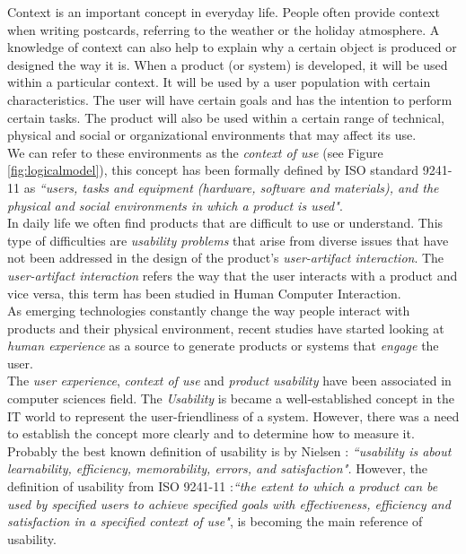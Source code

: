 Context is an important concept in everyday life. People often provide
context when writing postcards, referring to the weather or the holiday
atmosphere. A knowledge of context can also help to explain why a certain
object is produced or designed the way it is. When a product 
(or system) is developed, it
will be used within a particular context. It will be used by a user
population with certain characteristics. The user will have certain
goals and has the intention to perform certain tasks. The product 
will also be used
within a certain range of technical, physical and social or
organizational environments \cite{maguire2001context} that may affect
its use.\\   
We can refer to these environments as the \textit{context of use} (see
Figure \ref{fig:logicalmodel}), this concept has been formally defined
by ISO standard 9241-11 \cite{international1998iso} as \textit{``users,
tasks and equipment (hardware, software and materials), and the
physical and social environments in which a product is used"}. \\ 
In daily life we often find products that are difficult to use or
understand. This type of difficulties are \textit{usability problems}
that arise from  diverse issues that have not been addressed in the
design of the product's \textit{user-artifact interaction}. The
\textit{user-artifact interaction} refers the way that the user
interacts with a product and vice versa, this term has been studied
in Human Computer Interaction. \\As emerging technologies constantly
change the way people interact with products and their physical
environment, recent studies have started looking at \textit{human
experience} as a source to generate products or systems that
\textit{engage} the user.\\
The \textit{user experience}, \textit{context of use} and
\textit{product usability} have been associated in computer sciences
field. The \textit{Usability} is became a well-established concept in
the IT world to represent the user-friendliness of a system. However,
there was a need to establish the concept more clearly and to
determine how to measure it. Probably the best known definition of
usability is by Nielsen \cite{nielsen1994usability}: 
\textit{``usability is about learnability, efficiency, 
memorability, errors, and satisfaction".}
However, the definition of usability from ISO
9241-11 \cite{international1998iso}:\textit{``the extent to which a
product can be used by specified users to achieve specified  goals
with effectiveness, efficiency and satisfaction in a  specified
context of use"}, is becoming the main reference of usability. \\
